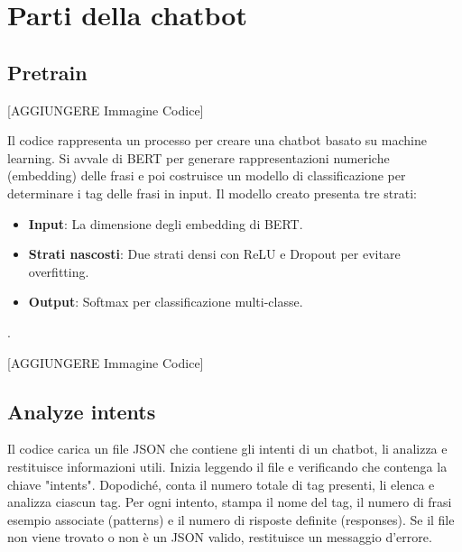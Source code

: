 \documentclass[12pt, letterpaper]{article}
\begin{document}
\section{Parti della chatbot}
\subsection{Pretrain}
[AGGIUNGERE Immagine Codice]


Il codice rappresenta un processo per creare una chatbot basato su machine learning. Si avvale di BERT per generare rappresentazioni numeriche (embedding) delle frasi e poi costruisce un modello di classificazione per determinare i tag delle frasi in input. 
Il modello creato presenta tre strati: 
\begin{itemize}
	\item \textbf{Input}:  La dimensione degli embedding di BERT.
	\item \textbf{Strati nascosti}: Due strati densi con ReLU e Dropout per evitare overfitting.
	\item \textbf{Output}: Softmax per classificazione multi-classe.
\end{itemize}.

[AGGIUNGERE Immagine Codice]

\subsection{Analyze intents}
Il codice carica un file JSON che contiene gli intenti di un chatbot, li analizza e restituisce informazioni utili. Inizia leggendo il file e verificando che contenga la chiave "intents". Dopodiché, conta il numero totale di tag presenti, li elenca e analizza ciascun tag. Per ogni intento, stampa il nome del tag, il numero di frasi esempio associate (patterns) e il numero di risposte definite (responses). Se il file non viene trovato o non è un JSON valido, restituisce un messaggio d'errore.
\end{document}
